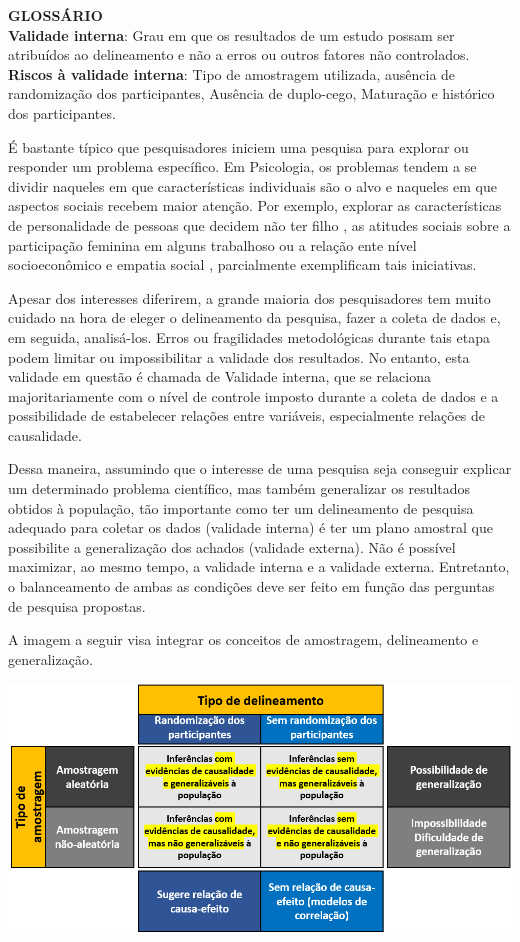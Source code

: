 \documentclass[
]{book}
\begin{document}
\begin{glossario}
\textbf{GLOSSÁRIO}\\
\textbf{Validade interna}: Grau em que os resultados de um estudo possam
ser atribuídos ao delineamento e não a erros ou outros fatores não
controlados.\\
\textbf{Riscos à validade interna}: Tipo de amostragem utilizada,
ausência de randomização dos participantes, Ausência de duplo-cego,
Maturação e histórico dos participantes.
\end{glossario}

É bastante típico que pesquisadores iniciem uma pesquisa para explorar ou responder um problema específico. Em Psicologia, os problemas tendem a se dividir naqueles em que características individuais são o alvo e naqueles em que aspectos sociais recebem maior atenção. Por exemplo, explorar as características de personalidade de pessoas que decidem não ter filho \citep{Neal2021}, as atitudes sociais sobre a participação feminina em alguns trabalhoso \citep{Bursztyn2018} ou a relação ente nível socioeconômico e empatia social \citep{Piff2012}, parcialmente exemplificam tais iniciativas.

Apesar dos interesses diferirem, a grande maioria dos pesquisadores tem muito cuidado na hora de eleger o delineamento da pesquisa, fazer a coleta de dados e, em seguida, analisá-los. Erros ou fragilidades metodológicas durante tais etapa podem limitar ou impossibilitar a validade dos resultados. No entanto, esta validade em questão é chamada de Validade interna, que se relaciona majoritariamente com o nível de controle imposto durante a coleta de dados e a possibilidade de estabelecer relações entre variáveis, especialmente relações de causalidade.

Dessa maneira, assumindo que o interesse de uma pesquisa seja conseguir explicar um determinado problema científico, mas também generalizar os resultados obtidos à população, tão importante como ter um delineamento de pesquisa adequado para coletar os dados (validade interna) é ter um plano amostral que possibilite a generalização dos achados (validade externa). Não é possível maximizar, ao mesmo tempo, a validade interna e a validade externa. Entretanto, o balanceamento de ambas as condições deve ser feito em função das perguntas de pesquisa propostas.

A imagem a seguir visa integrar os conceitos de amostragem, delineamento e generalização.

\includegraphics{./img/cap_amostra_delineamento.png}
\end{document}
